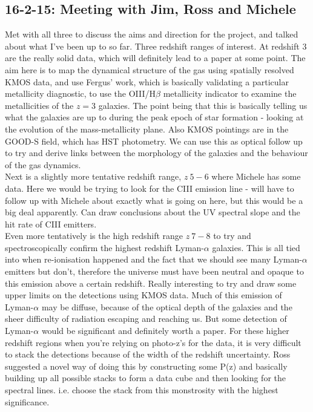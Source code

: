 \documentclass{literature}
\begin{document}
\subsection{16-2-15: Meeting with Jim, Ross and Michele}
Met with all three to discuss the aims and direction for the project, and talked about what I've been up to so far. 
Three redshift ranges of interest. At redshift 3 are the really solid data, which will definitely lead to a paper at some point. The aim here is
to map the dynamical structure of the gas using spatially resolved KMOS data, and use Fergus' work, which is basically validating a particular metallicity diagnostic, to use the OIII/H$\beta$ metallicity indicator to examine the metallicities of the $z=3$ galaxies. The point being that this is basically telling us what the galaxies are up to during the peak epoch of star formation - looking at the evolution of the mass-metallicity plane. Also KMOS pointings are in the GOOD-S field, which has HST photometry. We can use this as optical follow up to try and derive links between the morphology of the galaxies and the behaviour of the gas dynamics. \\ 
Next is a slightly more tentative redshift range, $z~5-6$ where Michele has some data. Here we would be trying to look for the CIII emission line - will have to follow up with Michele about exactly what is going on here, but this would be a big deal apparently. Can draw conclusions about the UV spectral slope and the hit rate of CIII emitters.  \\ 
Even more tentatively is the high redshift range $z~7-8$ to try and spectroscopically confirm the highest redshift Lyman-$\alpha$ galaxies. This is all tied into when re-ionisation happened and the fact that we should see many Lyman-$\alpha$ emitters but don't, therefore the universe must have been neutral and opaque to this emission above a certain redshift. Really interesting to try and draw some upper limits on the detections using KMOS data. Much of this emission of Lyman-$\alpha$ may be diffuse, because of the optical depth of the galaxies and the sheer difficulty of radiation escaping and reaching us. But some detection of Lyman-$\alpha$ would be significant and definitely worth a paper. For these higher redshift regions when you're relying on photo-z's for the data, it is very difficult to stack the detections because of the width of the redshift uncertainty. Ross suggested a novel way of doing this by constructing some P(z) and basically building up all possible stacks to form a data cube and then looking for the spectral lines. i.e. choose the stack from this monstrosity with the highest significance.  \\ 
\end{document}
